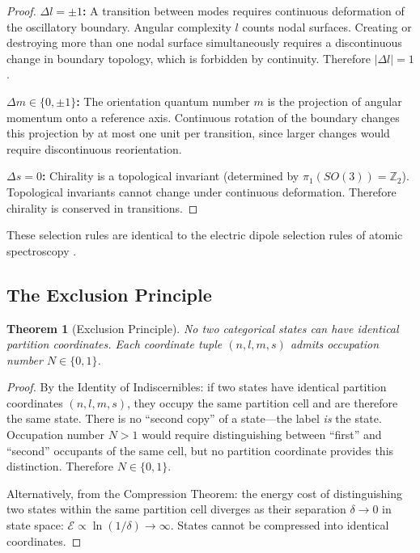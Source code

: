 \documentclass[11pt,a4paper]{article}
\newtheorem{theorem}{Theorem}[section]
\theoremstyle{definition}
\theoremstyle{remark}
\newcommand{\Integer}{\mathbb{Z}}
\begin{document}
\begin{proof}
\textbf{$\Delta l = \pm 1$:} A transition between modes requires continuous deformation of the oscillatory boundary. Angular complexity $l$ counts nodal surfaces. Creating or destroying more than one nodal surface simultaneously requires a discontinuous change in boundary topology, which is forbidden by continuity. Therefore $|\Delta l| = 1$.

\textbf{$\Delta m \in \{0, \pm 1\}$:} The orientation quantum number $m$ is the projection of angular momentum onto a reference axis. Continuous rotation of the boundary changes this projection by at most one unit per transition, since larger changes would require discontinuous reorientation.

\textbf{$\Delta s = 0$:} Chirality is a topological invariant (determined by $\pi_1(SO(3)) = \Integer_2$). Topological invariants cannot change under continuous deformation. Therefore chirality is conserved in transitions.
\end{proof}

These selection rules are identical to the electric dipole selection rules of atomic spectroscopy \citep{griffiths2018, herzberg1944}.

\subsection{The Exclusion Principle}

\begin{theorem}[Exclusion Principle]
\label{thm:exclusion}
No two categorical states can have identical partition coordinates. Each coordinate tuple $(n, l, m, s)$ admits occupation number $N \in \{0, 1\}$.
\end{theorem}

\begin{proof}
By the Identity of Indiscernibles: if two states have identical partition coordinates $(n, l, m, s)$, they occupy the same partition cell and are therefore the same state. There is no ``second copy'' of a state---the label \emph{is} the state. Occupation number $N > 1$ would require distinguishing between ``first'' and ``second'' occupants of the same cell, but no partition coordinate provides this distinction. Therefore $N \in \{0, 1\}$.

Alternatively, from the Compression Theorem: the energy cost of distinguishing two states within the same partition cell diverges as their separation $\delta \to 0$ in state space: $\mathcal{E} \propto \ln(1/\delta) \to \infty$. States cannot be compressed into identical coordinates.
\end{proof}
\end{document}
